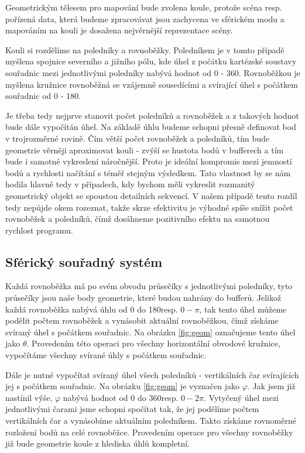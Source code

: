 Geometrickým tělesem pro mapování bude zvolena koule, protože scéna resp. pořízená data, která budeme zpracovávat jsou zachycena ve sférickém modu a mapováním na kouli je dosažena nejvěrnější reprezentace scény.

Kouli si rozdělíme na poledníky a rovnoběžky. Poledníkem je v tomto případě myšlena spojnice severního a jižního pólu, kde úhel z počátku kartézské soustavy souřadnic mezi jednotlivými poledníky nabývá hodnot od 0 - 360\degree. Rovnoběžkou je myšlena kružnice  rovnoběžná se vzájemně sousedícími a svírající úhel s počátkem souřadnic od 0 - 180\degree. 

Je třeba tedy nejprve stanovit počet poledníků a rovnoběžek a z takových hodnot bude dále vypočítán úhel. Na základě úhlu budeme schopni přesně definovat bod v trojrozměrné rovině. Čím větší počet rovnoběžek a poledníků, tím bude geometrie věrněji aproximovat kouli - zvýší se hustota bodů v bufferech a tím bude i samotné vykreslení náročnější. Proto je ideální kompromis mezi jemností bodů a rychlosti načítání s téměř stejným výsledkem. Tato vlastnost by se nám hodila hlavně tedy v případech, kdy bychom měli vykreslit rozmanitý geometrický objekt se spoustou detailních sekvencí. V našem případě tento rozdíl tedy nepůjde okem rozeznat, takže skrze efektivitu je výhodné spíše snížit počet rovnoběžek a poledníků, čímž dosáhneme pozitivního efektu na samotnou rychlost programu.


\subsection{Sférický souřadný systém}

Každá rovnoběžka má po svém obvodu průsečíky s jednotlivými poledníky, tyto průsečíky jsou naše body geometrie, které budou nahrány do bufferů. Jelikož každá rovnoběžka nabývá úhlu od 0 do 180\degree  resp. $0-\pi$, tak tento úhel můžeme podělit počtem rovnoběžek a vynásobit aktuální rovnoběžkou, čímž získáme svíraný úhel s počátkem souřadnic. Na obrázku \ref{fig:geom} označujeme tento úhel jako $\theta$. Provedením této operaci pro všechny horizontální obvodové kružnice, vypočítáme všechny svírané úhly s počátkem souřadnic. 

Dále je nutné vypočítat svíraný úhel všech poledníků - vertikálních čar svírajících jej s počátkem souřadnic. Na obrázku \ref{fig:geom} je vyznačen jako $\varphi$. Jak jsem již nastínil výše, $\varphi$ nabývá hodnot od 0 do 360\degree resp. $0-2\pi$. Vytyčený úhel mezi jednotlivými čarami jsme schopni spočítat tak, že jej podělíme počtem vertikálních čar a vynásobíme aktuálním poledníkem. Takto získáme rovnoměrné rozložení bodů na celé rovnoběžce. Provedením  operace pro všechny rovnoběžky již bude geometrie koule z hlediska úhlů kompletní.

